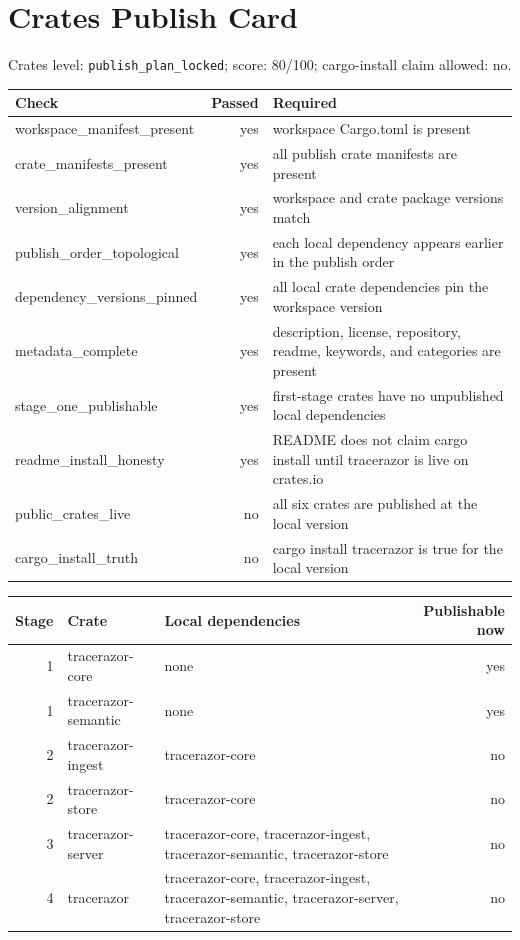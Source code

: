 \section{Crates Publish Card}
Crates level: \texttt{publish\_plan\_locked}; score: 80/100; cargo-install claim allowed: no.

\begin{tabular}{lrl}
Check & Passed & Required \\
\hline
workspace\_manifest\_present & yes & workspace Cargo.toml is present \\
crate\_manifests\_present & yes & all publish crate manifests are present \\
version\_alignment & yes & workspace and crate package versions match \\
publish\_order\_topological & yes & each local dependency appears earlier in the publish order \\
dependency\_versions\_pinned & yes & all local crate dependencies pin the workspace version \\
metadata\_complete & yes & description, license, repository, readme, keywords, and categories are present \\
stage\_one\_publishable & yes & first-stage crates have no unpublished local dependencies \\
readme\_install\_honesty & yes & README does not claim cargo install until tracerazor is live on crates.io \\
public\_crates\_live & no & all six crates are published at the local version \\
cargo\_install\_truth & no & cargo install tracerazor is true for the local version \\
\end{tabular}

\begin{tabular}{rllr}
Stage & Crate & Local dependencies & Publishable now \\
\hline
1 & tracerazor-core & none & yes \\
1 & tracerazor-semantic & none & yes \\
2 & tracerazor-ingest & tracerazor-core & no \\
2 & tracerazor-store & tracerazor-core & no \\
3 & tracerazor-server & tracerazor-core, tracerazor-ingest, tracerazor-semantic, tracerazor-store & no \\
4 & tracerazor & tracerazor-core, tracerazor-ingest, tracerazor-semantic, tracerazor-server, tracerazor-store & no \\
\end{tabular}
